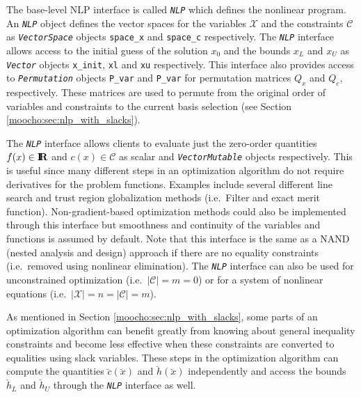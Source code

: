 \documentclass[pdf,12pt,report]{SANDreport}
\begin{document}
The base-level NLP interface is called {}\texttt{\textit{NLP}} which defines
the nonlinear program.  An {}\texttt{\textit{NLP}} object defines the vector
spaces for the variables $\mathcal{X}$ and the constraints $\mathcal{C}$ as
{}\texttt{\textit{Vector\-Space}} objects {}\texttt{space\_x} and
{}\texttt{space\_c} respectively.  The {}\texttt{\textit{NLP}} interface
allows access to the initial guess of the solution $x_0$ and the bounds $x_L$
and $x_U$ as {}\texttt{\textit{Vector}} objects {}\texttt{x\_init},
{}\texttt{xl} and {}\texttt{xu} respectively.  This interface also provides
access to {}\texttt{\textit{Permutation}} objects {}\texttt{P\_var} and
{}\texttt{P\_var} for permutation matrices $Q_x$ and $Q_c$, respectively.
These matrices are used to permute from the original order of variables and
constraints to the current basis selection (see Section
{}\ref{moocho:sec:nlp_with_slacks}).

The {}\texttt{\textit{NLP}} interface allows clients to evaluate just the
zero-order quantities $f(x) \in \mbox{\textbf{I}}\hspace{-0.6ex}\mbox{\textbf{R}}$ and $c(x) \in \mathcal{C}$ as scalar and
{}\texttt{\textit{Vector\-Mutable}} objects respectively.  This is useful
since many different steps in an optimization algorithm do not require
derivatives for the problem functions.  Examples include several different
line search and trust region globalization methods (i.e.\ Filter and exact
merit function).  Non-gradient-based optimization methods could also be
implemented through this interface but smoothness and continuity of the
variables and functions is assumed by default.  Note that this interface is
the same as a NAND (nested analysis and design) approach if there are no
equality constraints (i.e.\ removed using nonlinear elimination).  The
{}\texttt{\textit{NLP}} interface can also be used for unconstrained
optimization (i.e.\ $|\mathcal{C}| = m = 0$) or for a system of nonlinear
equations (i.e.\ $|\mathcal{X}| = n = |\mathcal{C}| = m$).

As mentioned in Section {}\ref{moocho:sec:nlp_with_slacks}, some parts of an
optimization algorithm can benefit greatly from knowing about general
inequality constraints and become less effective when these constraints are
converted to equalities using slack variables.  These steps in the
optimization algorithm can compute the quantities $\breve{c}(\breve{x})$ and
$\breve{h}(\breve{x})$ independently and access the bounds $\breve{h}_L$ and
$\breve{h}_U$ through the {}\texttt{\textit{NLP}} interface as well.
\end{document}
